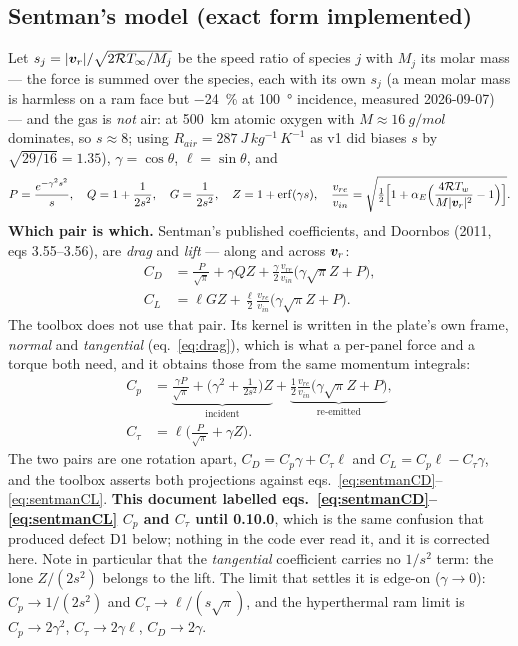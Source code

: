 \subsection{Sentman's model (exact form implemented)}
Let $s_j=|\bm{v}_r|/\sqrt{2\mathcal RT_\infty/M_j}$ be the speed ratio of species $j$ with $M_j$ its molar mass --- the force is summed over the species, each with its own $s_j$ (a mean molar mass is harmless on a ram face but \SI{-24}{\percent} at \SI{100}{\degree} incidence, measured 2026-09-07) --- and the gas is \emph{not} air: at \SI{500}{\kilo\metre} atomic oxygen with $M\approx\SI{16}{g/mol}$ dominates, so $s\approx8$; using $R_{air}=\SI{287}{J\,kg^{-1}\,K^{-1}}$ as v1 did biases $s$ by $\sqrt{29/16}=1.35$), $\gamma=\cos\theta$, $\ell=\sin\theta$, and
\begin{equation}
P=\frac{e^{-\gamma^2s^2}}{s},\quad Q=1+\frac1{2s^2},\quad G=\frac1{2s^2},\quad Z=1+\operatorname{erf}(\gamma s),\quad
\frac{v_{re}}{v_{in}}=\sqrt{\tfrac12\Big[1+\alpha_E\Big(\frac{4\mathcal RT_w}{M|\bm{v}_r|^2}-1\Big)\Big]}.
\end{equation}
\textbf{Which pair is which.} Sentman's published coefficients, and Doornbos (2011, eqs 3.55--3.56), are \emph{drag} and \emph{lift} --- along and across $\bm{v}_r$:
\begin{align}
C_D&=\frac{P}{\sqrt\pi}+\gamma QZ+\frac{\gamma}{2}\frac{v_{re}}{v_{in}}\big(\gamma\sqrt\pi Z+P\big),\label{eq:sentmanCD}\\
C_L&=\ell GZ+\frac{\ell}{2}\frac{v_{re}}{v_{in}}\big(\gamma\sqrt\pi Z+P\big).\label{eq:sentmanCL}
\end{align}
The toolbox does not use that pair. Its kernel is written in the plate's own frame, \emph{normal} and \emph{tangential} (eq.~\eqref{eq:drag}), which is what a per-panel force and a torque both need, and it obtains those from the same momentum integrals:
\begin{align}
C_p&=\underbrace{\frac{\gamma P}{\sqrt\pi}+\Big(\gamma^2+\frac1{2s^2}\Big)Z}_{\text{incident}}+\underbrace{\frac12\frac{v_{re}}{v_{in}}\big(\gamma\sqrt\pi Z+P\big)}_{\text{re-emitted}},\label{eq:sentmanCp}\\
C_\tau&=\ell\Big(\frac{P}{\sqrt\pi}+\gamma Z\Big).\label{eq:sentmanCtau}
\end{align}
The two pairs are one rotation apart, $C_D=C_p\gamma+C_\tau\ell$ and $C_L=C_p\ell-C_\tau\gamma$, and the toolbox asserts both projections against eqs.~\eqref{eq:sentmanCD}--\eqref{eq:sentmanCL}. \textbf{This document labelled eqs.~\eqref{eq:sentmanCD}--\eqref{eq:sentmanCL} $C_p$ and $C_\tau$ until 0.10.0}, which is the same confusion that produced defect D1 below; nothing in the code ever read it, and it is corrected here. Note in particular that the \emph{tangential} coefficient carries no $1/s^2$ term: the lone $Z/(2s^2)$ belongs to the lift. The limit that settles it is edge-on ($\gamma\to0$): $C_p\to1/(2s^2)$ and $C_\tau\to\ell/(s\sqrt\pi)$, and the hyperthermal ram limit is $C_p\to2\gamma^2$, $C_\tau\to2\gamma\ell$, $C_D\to2\gamma$.

